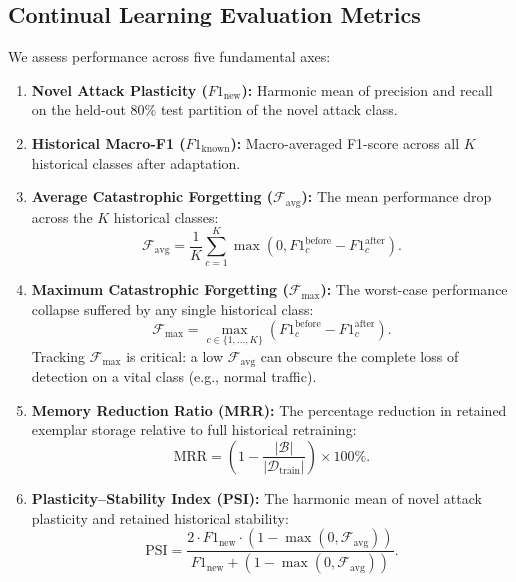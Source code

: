 \documentclass[conference]{IEEEtran}
\begin{document}
\subsection{Continual Learning Evaluation Metrics}
We assess performance across five fundamental axes:
\begin{enumerate}
    \item \textbf{Novel Attack Plasticity ($F1_{\text{new}}$):} Harmonic mean of precision and recall on the held-out $80\%$ test partition of the novel attack class.
    \item \textbf{Historical Macro-F1 ($F1_{\text{known}}$):} Macro-averaged F1-score across all $K$ historical classes after adaptation.
    \item \textbf{Average Catastrophic Forgetting ($\mathcal{F}_{\text{avg}}$):} The mean performance drop across the $K$ historical classes:
    \begin{equation}
    \mathcal{F}_{\text{avg}} = \frac{1}{K} \sum_{c=1}^{K} \max(0, F1_c^{\text{before}} - F1_c^{\text{after}}).
    \end{equation}
    \item \textbf{Maximum Catastrophic Forgetting ($\mathcal{F}_{\max}$):} The worst-case performance collapse suffered by any single historical class:
    \begin{equation}
    \mathcal{F}_{\max} = \max_{c \in \{1,\dots,K\}} (F1_c^{\text{before}} - F1_c^{\text{after}}).
    \end{equation}
    Tracking $\mathcal{F}_{\max}$ is critical: a low $\mathcal{F}_{\text{avg}}$ can obscure the complete loss of detection on a vital class (e.g., normal traffic).
    \item \textbf{Memory Reduction Ratio (MRR):} The percentage reduction in retained exemplar storage relative to full historical retraining:
    \begin{equation}
    \text{MRR} = \left(1 - \frac{|\mathcal{B}|}{|\mathcal{D}_{\text{train}}|}\right) \times 100\%.
    \end{equation}
    \item \textbf{Plasticity--Stability Index (PSI):} The harmonic mean of novel attack plasticity and retained historical stability:
    \begin{equation}
    \text{PSI} = \frac{2 \cdot F1_{\text{new}} \cdot (1 - \max(0, \mathcal{F}_{\text{avg}}))}{F1_{\text{new}} + (1 - \max(0, \mathcal{F}_{\text{avg}}))}.
    \end{equation}
\end{enumerate}
\end{document}
